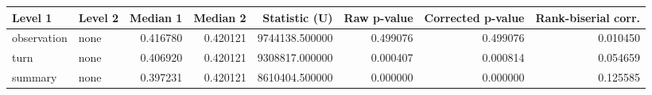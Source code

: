 \begin{tabular}{llrrrrrr}
\toprule
Level 1 & Level 2 & Median 1 & Median 2 & Statistic (U) & Raw p-value & Corrected p-value & Rank-biserial corr. \\
\midrule
observation & none & 0.416780 & 0.420121 & 9744138.500000 & 0.499076 & 0.499076 & 0.010450 \\
turn & none & 0.406920 & 0.420121 & 9308817.000000 & 0.000407 & 0.000814 & 0.054659 \\
summary & none & 0.397231 & 0.420121 & 8610404.500000 & 0.000000 & 0.000000 & 0.125585 \\
\bottomrule
\end{tabular}

